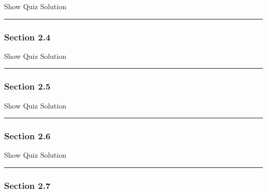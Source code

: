\documentclass[]{article}
\begin{document}
Show Quiz Solution

\hypertarget{display.Quiz23.2}{}
\begin{center}\rule{0.5\linewidth}{\linethickness}\end{center}

\subsubsection{Section 2.4}\label{section-2.4}

\hypertarget{surveyElement24}{}

\hypertarget{surveyResult24}{}

Show Quiz Solution

\hypertarget{display.Quiz24.2}{}
\begin{center}\rule{0.5\linewidth}{\linethickness}\end{center}

\subsubsection{Section 2.5}\label{section-2.5}

\hypertarget{surveyElement25}{}

\hypertarget{surveyResult25}{}

Show Quiz Solution

\hypertarget{display.Quiz25.2}{}
\begin{center}\rule{0.5\linewidth}{\linethickness}\end{center}

\subsubsection{Section 2.6}\label{section-2.6}

\hypertarget{surveyElement26}{}

\hypertarget{surveyResult26}{}

Show Quiz Solution

\hypertarget{display.Quiz26.2}{}
\begin{center}\rule{0.5\linewidth}{\linethickness}\end{center}

\subsubsection{Section 2.7}\label{section-2.7}

\hypertarget{surveyElement27}{}
\end{document}
